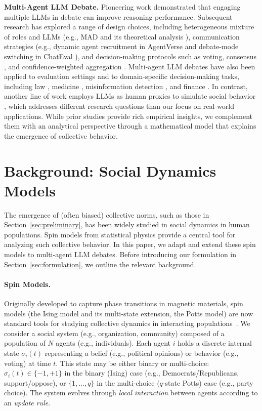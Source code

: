 \documentclass{article}
\theoremstyle{plain}
\theoremstyle{definition}
\theoremstyle{remark}
\begin{document}
\textbf{Multi-Agent LLM Debate. }
Pioneering work \cite{du2023improving} demonstrated that engaging multiple LLMs in debate can improve reasoning performance.
Subsequent research has explored a range of design choices, including heterogeneous mixture of roles and LLMs (e.g., MAD \cite{liang2023encouraging} and its theoretical analysis \cite{estornell2024}), communication strategies (e.g., dynamic agent recruitment in AgentVerse \cite{chen2023agentverse} and debate-mode switching in ChatEval \cite{chan2023chateval}), and decision-making protocols such as voting, consensus \cite{kaesberg-etal-2025-voting, choi2025debate}, and confidence-weighted aggregation \cite{chen2024reconcile}.
Multi-agent LLM debates have also been applied to evaluation settings \cite{ki-etal-2025-multiple, chan2023chateval} and to domain-specific decision-making tasks, including law \cite{jiang2025agentsbench}, medicine \cite{kim2024mdagentsadaptivecollaborationllms}, misinformation detection \cite{liu2025truth}, and finance \cite{yu2024fincon}. 
In contrast, another line of work employs LLMs as human proxies to simulate social behavior \cite{chuang-etal-2024-simulating, piao2025emergence, zhou2024sotopia, Park2023GenerativeAgents}, which addresses different research questions than our focus on real-world applications. 
While prior studies provide rich empirical insights, we complement them with an analytical perspective through a mathematical model that explains the emergence of collective behavior. 


\section{Background: Social Dynamics Models}\label{sec:background}
The emergence of (often biased) collective norms, such as those in Section~\ref{sec:preliminary}, has been widely studied in social dynamics in human populations.
Spin models from statistical physics provide a central tool for analyzing such collective behavior.
In this paper, we adapt and extend these spin models to multi-agent LLM debates.
Before introducing our formulation in Section~\ref{sec:formulation}, we outline the relevant background. 

\paragraph{Spin Models. }
Originally developed to capture phase transitions in magnetic materials, spin models (the Ising model and its multi-state extension, the Potts model) are now standard tools for studying collective dynamics in interacting populations~\citep{brock2001discrete}. 
We consider a social system (e.g., organization, community) composed of a population of $N$ agents (e.g., individuals). Each agent $i$ holds a discrete internal state $\sigma_i(t)$ representing a belief (e.g., political opinions) or behavior (e.g., voting) at time $t$. This state may be either binary or multi-choice: $\sigma_i(t) \in \{-1,+1\}$ in the binary (Ising) case (e.g., Democrats/Republicans, support/oppose), or $\{1,\dots,q\}$ in the multi-choice ($q$-state Potts) case (e.g., party choice). The system evolves through {\sl local interaction} between agents according to an {\sl update rule}. 
\end{document}
